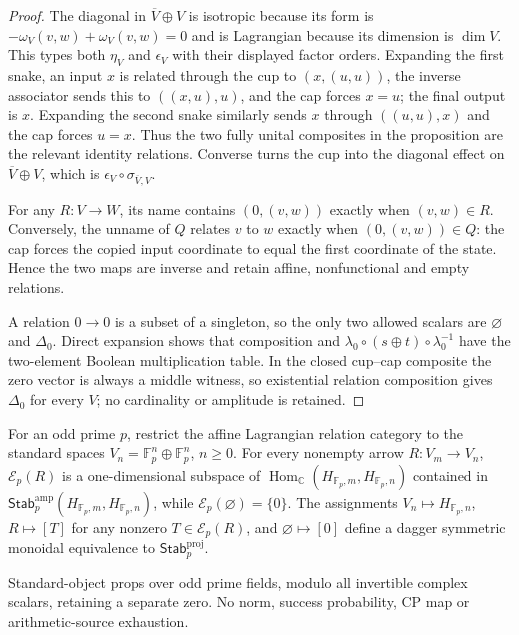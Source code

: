 \begin{proof}
The diagonal in $\overline V\oplus V$ is isotropic because its form is
$-\omega_V(v,w)+\omega_V(v,w)=0$ and is Lagrangian because its dimension is
$\dim V$.  This types both $\eta_V$ and $\epsilon_V$ with their displayed
factor orders.  Expanding the first snake, an input $x$ is related through
the cup to $(x,(u,u))$, the inverse associator sends this to $((x,u),u)$,
and the cap forces $x=u$; the final output is $x$.  Expanding the second
snake similarly sends $x$ through $((u,u),x)$ and the cap forces $u=x$.
Thus the two fully unital composites in the proposition are the relevant
identity relations.  Converse turns the cup into the diagonal effect on
$\overline V\oplus V$, which is
$\epsilon_V\circ\sigma_{\overline V,V}$.

For any $R:V\to W$, its name contains $(0,(v,w))$ exactly when
$(v,w)\in R$.  Conversely, the unname of $Q$ relates $v$ to $w$ exactly
when $(0,(v,w))\in Q$: the cap forces the copied input coordinate to equal
the first coordinate of the state.  Hence the two maps are inverse and
retain affine, nonfunctional and empty relations.

A relation $0\to0$ is a subset of a singleton, so the only two allowed
scalars are $\varnothing$ and $\Delta_0$.  Direct expansion shows that
composition and
$\lambda_0\circ(s\oplus t)\circ\lambda_0^{-1}$ have the two-element
Boolean multiplication table.  In the closed cup--cap composite the zero
vector is always a middle witness, so existential relation composition
gives $\Delta_0$ for every $V$; no cardinality or amplitude is retained.
\end{proof}

\begin{proposition}
\statusProved{}
For an odd prime $p$, restrict the affine Lagrangian relation category to the standard spaces $V_n=\mathbb F_p^n\oplus\mathbb F_p^n$, $n\geq0$. For every nonempty arrow $R:V_m\to V_n$, $\mathcal E_p(R)$ is a one-dimensional subspace of $\operatorname{Hom}_{\mathbb C}(H_{\mathbb F_p,m},H_{\mathbb F_p,n})$ contained in $\mathsf{Stab}^{\mathrm{amp}}_p(H_{\mathbb F_p,m},H_{\mathbb F_p,n})$, while $\mathcal E_p(\varnothing)=\{0\}$. The assignments $V_n\mapsto H_{\mathbb F_p,n}$, $R\mapsto[T]$ for any nonzero $T\in\mathcal E_p(R)$, and $\varnothing\mapsto[0]$ define a dagger symmetric monoidal equivalence to $\mathsf{Stab}^{\mathrm{proj}}_p$.
\end{proposition}
\begin{scope}
Standard-object props over odd prime fields, modulo all invertible complex scalars, retaining a separate zero. No norm, success probability, CP map or arithmetic-source exhaustion.
\end{scope}

